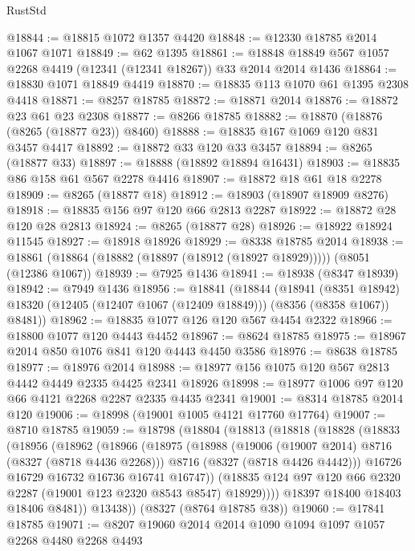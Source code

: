 \begin{lexlean}{RustStd}
\begin{coremodule}
{\begin{coremodule}
{{{{{{{{{{{{{{{{{{{{{{{{{{{{{{{{{{{{{{{{{{{{{{{{{{{{{{@18844 := @18815 @1072 @1357 @4420
@18848 := @12330 @18785 @2014 @1067 @1071
@18849 := @62 @1395
@18861 := @18848 @18849 @567 @1057 @2268 @4419 (@12341 (@12341 @18267)) @33 @2014 @2014 @1436
@18864 := @18830 @1071 @18849 @4419
@18870 := @18835 @113 @1070 @61 @1395 @2308 @4418
@18871 := @8257 @18785
@18872 := @18871 @2014
@18876 := @18872 @23 @61 @23 @2308
@18877 := @8266 @18785
@18882 := @18870 (@18876 (@8265 (@18877 @23)) @8460)
@18888 := @18835 @167 @1069 @120 @831 @3457 @4417
@18892 := @18872 @33 @120 @33 @3457
@18894 := @8265 (@18877 @33)
@18897 := @18888 (@18892 @18894 @16431)
@18903 := @18835 @86 @158 @61 @567 @2278 @4416
@18907 := @18872 @18 @61 @18 @2278
@18909 := @8265 (@18877 @18)
@18912 := @18903 (@18907 @18909 @8276)
@18918 := @18835 @156 @97 @120 @66 @2813 @2287
@18922 := @18872 @28 @120 @28 @2813
@18924 := @8265 (@18877 @28)
@18926 := @18922 @18924 @11545
@18927 := @18918 @18926
@18929 := @8338 @18785 @2014
@18938 := @18861 (@18864 (@18882 (@18897 (@18912 (@18927 @18929))))) (@8051 (@12386 @1067))
@18939 := @7925 @1436
@18941 := @18938 (@8347 @18939)
@18942 := @7949 @1436
@18956 := @18841
    (@18844
      (@18941
        (@8351 @18942)
        @18320
        (@12405 (@12407 @1067 (@12409 @18849)))
        (@8356 (@8358 @1067))
        @8481))
@18962 := @18835 @1077 @126 @120 @567 @4454 @2322
@18966 := @18800 @1077 @120 @4443 @4452
@18967 := @8624 @18785
@18975 := @18967 @2014 @850 @1076 @841 @120 @4443 @4450 @3586
@18976 := @8638 @18785
@18977 := @18976 @2014
@18988 := @18977 @156 @1075 @120 @567 @2813 @4442 @4449 @2335 @4425 @2341 @18926
@18998 := @18977 @1006 @97 @120 @66 @4121 @2268 @2287 @2335 @4435 @2341
@19001 := @8314 @18785 @2014 @120
@19006 := @18998 (@19001 @1005 @4121 @17760 @17764)
@19007 := @8710 @18785
@19059 := @18798
    (@18804
      (@18813
        (@18818
          (@18828
            (@18833
              (@18956
                (@18962
                  (@18966
                    (@18975
                      (@18988
                        (@19006 (@19007 @2014) @8716 (@8327 (@8718 @4436 @2268)))
                        @8716
                        (@8327 (@8718 @4426 @4442)))
                      @16726
                      @16729
                      @16732
                      @16736
                      @16741
                      @16747))
                  (@18835 @124 @97 @120 @66 @2320 @2287 (@19001 @123 @2320 @8543 @8547) @18929))))
            @18397
            @18400
            @18403
            @18406
            @8481))
        @13438))
    (@8327 (@8764 @18785 @38))
@19060 := @17841 @18785
@19071 := @8207 @19060 @2014 @2014 @1090 @1094 @1097 @1057 @2268 @4480 @2268 @4493
}}}}}}}}}}}}}}}}}}}}}}}}}}}}}}}}}}}}}}}}}}}}}}}}}}}}}}
\end{coremodule}}
\end{coremodule}
\end{lexlean}
